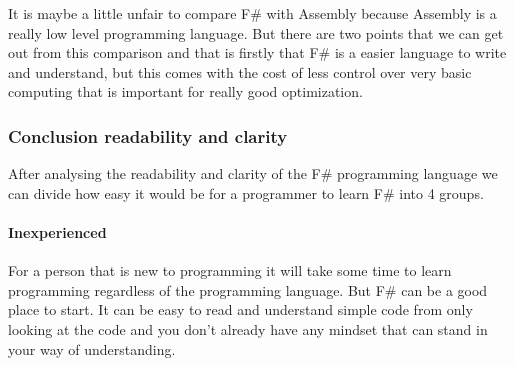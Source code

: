 \documentclass[12pt, a4paper]{article}
\newcommand*\quotefont{\fontfamily{LinuxLibertineT-LF}} %
\newcommand*\quotesize{60} %
\newcommand*{\openquote}
   {\tikz[remember picture,overlay,xshift=-4ex,yshift=-2.5ex]
   \node (OQ) {\quotefont\fontsize{\quotesize}{\quotesize}\selectfont``};\kern0pt}
\newcommand*{\closequote}[1]
  {\tikz[remember picture,overlay,xshift=4ex,yshift={#1}]
   \node (CQ) {\quotefont\fontsize{\quotesize}{\quotesize}\selectfont''};}
\newcommand*\shadedauthorformat{\emph} %
\newcommand*\authoralign[1]{
 	\def\authorfill{\hfill}\def\quotefill{}
}
\newenvironment{shadequote}[2][l]%
{\authoralign{#1}
\ifblank{#2}
   {\def\shadequoteauthor{}\def\yshift{-2ex}\def\quotefill{\hfill}}
   {\def\shadequoteauthor{\par\authorfill\shadedauthorformat{#2}}\def\yshift{2ex}}
\begin{snugshade}\begin{quote}\openquote}
{\shadequoteauthor\quotefill\closequote{\yshift}\end{quote}\end{snugshade}}
\begin{document}
It is maybe a little unfair to compare F\# with Assembly because Assembly is a really low level programming language. But there are two points that we can get out from this comparison and that is firstly that F\# is a easier language to write and understand, but this comes with the cost of less control over very basic computing that is important for really good optimization.

\newpage






\subsubsection{Conclusion readability and clarity}

After analysing the readability and clarity of the F\# programming language we can divide how easy it would be for a programmer to learn F\# into 4 groups.

\paragraph{Inexperienced}
For a person that is new to programming it will take some time to learn programming regardless of the programming language. But F\# can be a good place to start. It can be easy to read and understand simple code from only looking at the code and you don't already have any mindset that can stand in your way of understanding.
\end{document}
